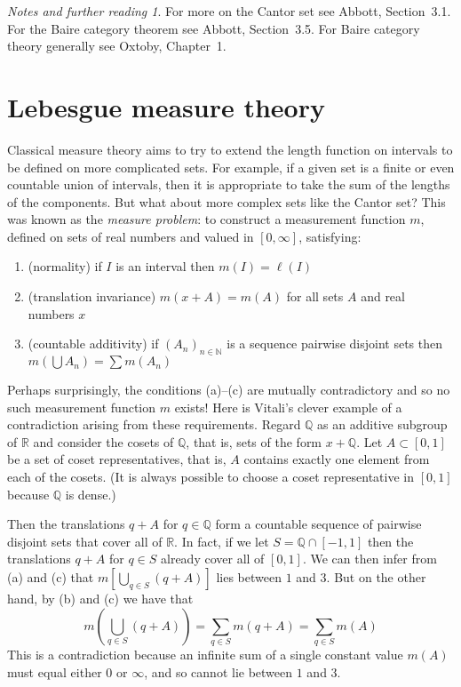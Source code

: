 \documentclass[11pt,oneside]{amsbook}
\newcommand{\N}{\mathbb N}
\newcommand{\Q}{\mathbb Q}
\newcommand{\R}{\mathbb R}
\theoremstyle{definition}
\theoremstyle{plain}
\theoremstyle{definition}
\theoremstyle{remark}
\newtheorem*{notes}{Notes and further reading}
\numberwithin{equation}{section}
\numberwithin{figure}{section}
\begin{document}
\begin{notes}
  For more on the Cantor set see Abbott, Section~3.1. For the Baire category theorem see Abbott, Section~3.5. For Baire category theory generally see Oxtoby, Chapter~1.
\end{notes}


\newpage
\section{Lebesgue measure theory}

Classical measure theory aims to try to extend the length function on intervals to be defined on more complicated sets. For example, if a given set is a finite or even countable union of intervals, then it is appropriate to take the sum of the lengths of the components. But what about more complex sets like the Cantor set? This was known as the \emph{measure problem}: to construct a measurement function $m$, defined on sets of real numbers and valued in $[0,\infty]$, satisfying:

\begin{enumerate}
  \item (normality) if $I$ is an interval then $m(I)=\ell(I)$
  \item (translation invariance) $m(x+A)=m(A)$ for all sets $A$ and real numbers $x$
  \item (countable additivity) if $(A_n)_{n\in\N}$ is a sequence pairwise disjoint sets then $m(\bigcup A_n)=\sum m(A_n)$
\end{enumerate}

Perhaps surprisingly, the conditions (a)--(c) are mutually contradictory and so no such measurement function $m$ exists! Here is Vitali's clever example of a contradiction arising from these requirements. Regard $\Q$ as an additive subgroup of $\R$ and consider the cosets of $\Q$, that is, sets of the form $x+\Q$. Let $A\subset[0,1]$ be a set of coset representatives, that is, $A$ contains exactly one element from each of the cosets. (It is always possible to choose a coset representative in $[0,1]$ because $\Q$ is dense.)

Then the translations $q+A$ for $q\in\Q$ form a countable sequence of pairwise disjoint sets that cover all of $\R$. In fact, if we let $S=\Q\cap[-1,1]$ then the translations $q+A$ for $q\in S$ already cover all of $[0,1]$. We can then infer from (a) and (c) that $m[\bigcup_{q\in S}(q+A)]$ lies between $1$ and $3$. But on the other hand, by (b) and (c) we have that
\[m\left(\bigcup_{q\in S}(q+A)\right)=\sum_{q\in S}m(q+A)=\sum_{q\in S}m(A)
\]
This is a contradiction because an infinite sum of a single constant value $m(A)$ must equal either $0$ or $\infty$, and so cannot lie between $1$ and $3$.
\end{document}
